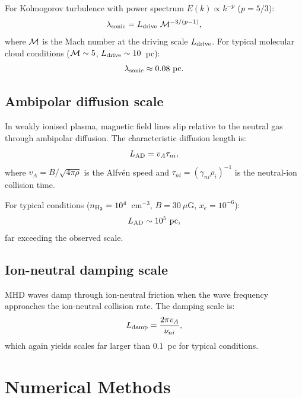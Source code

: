 \documentclass{mnras}
\begin{document}
For Kolmogorov turbulence with power spectrum $E(k) \propto k^{-p}$ ($p = 5/3$):
\begin{equation}
\lambda_{\rm sonic} = L_{\rm drive}~{\cal M}^{-3/(p-1)},
\end{equation}
where ${\cal M}$ is the Mach number at the driving scale $L_{\rm drive}$. For typical molecular cloud conditions (${\cal M} \sim 5$, $L_{\rm drive} \sim 10$~pc):
\begin{equation}
\lambda_{\rm sonic} \approx 0.08~{\rm pc}.
\end{equation}

\subsection{Ambipolar diffusion scale}

In weakly ionised plasma, magnetic field lines slip relative to the neutral gas through ambipolar diffusion. The characteristic diffusion length is:
\begin{equation}
L_{\rm AD} = v_A \tau_{ni},
\end{equation}
where $v_A = B/\sqrt{4\pi\rho}$ is the Alfv\'en speed and $\tau_{ni} = (\gamma_{ni} \rho_i)^{-1}$ is the neutral-ion collision time.

For typical conditions ($n_{\rm H_2} = 10^4$~cm$^{-3}$, $B = 30~\mu$G, $x_e = 10^{-6}$):
\begin{equation}
L_{\rm AD} \sim 10^5~{\rm pc},
\end{equation}
far exceeding the observed scale.

\subsection{Ion-neutral damping scale}

MHD waves damp through ion-neutral friction when the wave frequency approaches the ion-neutral collision rate. The damping scale is:
\begin{equation}
L_{\rm damp} = \frac{2\pi v_A}{\nu_{ni}},
\end{equation}
which again yields scales far larger than $0.1$~pc for typical conditions.


\section{Numerical Methods}
\end{document}
